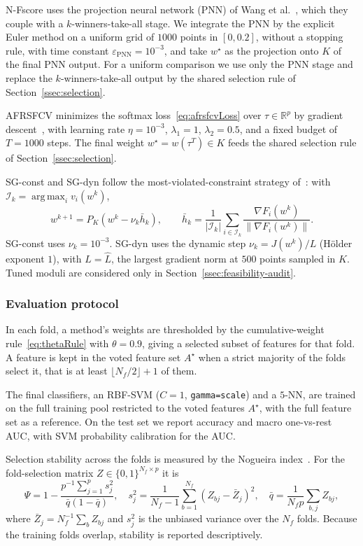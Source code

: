 \documentclass[]{interact}
\theoremstyle{plain}
\theoremstyle{definition}
\theoremstyle{remark}
\newcommand{\R}{\mathbb{R}}
\DeclareMathOperator*{\argmax}{arg\,max}
\begin{document}
N-Fscore uses the projection neural network (PNN) of Wang et al.~\citep{wang2021fractional}, which they couple with a $k$-winners-take-all stage. We integrate the PNN by the explicit Euler method on a uniform grid of $1000$ points in $[0,0.2]$, without a stopping rule, with time constant $\varepsilon_{\mathrm{PNN}}=10^{-3}$, and take $w^\star$ as the projection onto $K$ of the final PNN output. For a uniform comparison we use only the PNN stage and replace the $k$-winners-take-all output by the shared selection rule of Section~\ref{ssec:selection}.

AFRSFCV minimizes the softmax loss~\eqref{eq:afrsfcvLoss} over $\tau\in\R^p$ by gradient descent~\citep{wang2026afrsfcv}, with learning rate $\eta=10^{-3}$, $\lambda_1=1$, $\lambda_2=0.5$, and a fixed budget of $T=1000$ steps. The final weight $w^\star=w(\tau^T)\in K$ feeds the shared selection rule of Section~\ref{ssec:selection}.

SG-const and SG-dyn follow the most-violated-constraint strategy of~\citep{hu2022quasi}: with $\mathcal I_k=\argmax_i v_i(w^k)$,
\[
w^{k+1}=P_K(w^k-\nu_k\bar h_k),\qquad
\bar h_k=\frac1{|\mathcal I_k|}\sum_{i\in\mathcal I_k}\frac{\nabla F_i(w^k)}{\|\nabla F_i(w^k)\|}.
\]
SG-const uses $\nu_k=10^{-3}$. SG-dyn uses the dynamic step $\nu_k=J(w^k)/L$ (H\"older exponent $1$), with $L=\widehat L$, the largest gradient norm at $500$ points sampled in $K$. Tuned moduli are considered only in Section~\ref{ssec:feasibility-audit}.

\subsubsection{Evaluation protocol}\label{sssec:protocol}
In each fold, a method's weights are thresholded by the cumulative-weight rule~\eqref{eq:thetaRule} with $\theta=0.9$, giving a selected subset of features for that fold. A feature is kept in the voted feature set $A^\star$ when a strict majority of the folds select it, that is at least $\lfloor N_f/2\rfloor+1$ of them.

The final classifiers, an RBF-SVM ($C=1$, \texttt{gamma=scale}) and a $5$-NN, are trained on the full training pool restricted to the voted features $A^\star$, with the full feature set as a reference. On the test set we report accuracy and macro one-vs-rest AUC, with SVM probability calibration for the AUC.

Selection stability across the folds is measured by the Nogueira index~\citep{nogueira2018}. For the fold-selection matrix $Z\in\{0,1\}^{N_f\times p}$ it is
\[
\Psi=1-\frac{p^{-1}\sum_{j=1}^{p}s_j^2}{\bar q(1-\bar q)},\quad
s_j^2=\frac{1}{N_f-1}\sum_{b=1}^{N_f}(Z_{bj}-\bar Z_j)^2,\quad
\bar q=\frac{1}{N_f p}\sum_{b,j}Z_{bj},
\]
where $\bar Z_j=N_f^{-1}\sum_b Z_{bj}$ and $s_j^2$ is the unbiased variance over the $N_f$ folds. Because the training folds overlap, stability is reported descriptively.
\end{document}
